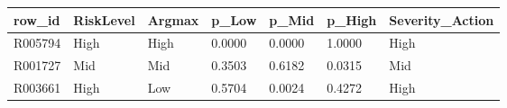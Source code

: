 \begin{tabular}{lllllll}
\toprule
row\_id & RiskLevel & Argmax & p\_Low & p\_Mid & p\_High & Severity\_Action \\
\midrule
R005794 & High & High & 0.0000 & 0.0000 & 1.0000 & High \\
R001727 & Mid & Mid & 0.3503 & 0.6182 & 0.0315 & Mid \\
R003661 & High & Low & 0.5704 & 0.0024 & 0.4272 & High \\
\bottomrule
\end{tabular}